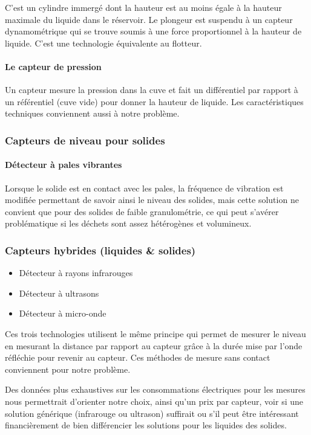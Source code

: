 C'est un cylindre immergé dont la hauteur est au moins égale à la hauteur maximale du liquide dans le réservoir. Le plongeur est suspendu à un capteur dynamométrique qui se trouve soumis à une force proportionnel à la hauteur de liquide. C’est une technologie équivalente au flotteur.

\paragraph{Le capteur de pression}

Un capteur mesure la pression dans la cuve et fait un différentiel par rapport à un référentiel (cuve vide) pour donner la hauteur de liquide. Les caractéristiques techniques conviennent aussi à notre problème.

\subsubsection{Capteurs de niveau pour solides}

\paragraph{Détecteur à pales vibrantes}

Lorsque le solide est en contact avec les pales, la fréquence de vibration est modifiée permettant de savoir ainsi le niveau des solides, mais cette solution ne convient que pour des solides de faible granulométrie, ce qui peut s’avérer problématique si les déchets sont assez hétérogènes et volumineux.

\subsubsection{Capteurs hybrides (liquides \&  solides)}

\begin{itemize}
\item Détecteur à rayons infrarouges
\item Détecteur à ultrasons
\item Détecteur à micro-onde
\end{itemize}

Ces trois technologies utilisent le même principe qui permet de mesurer le niveau en mesurant la distance par rapport au capteur grâce à la durée mise par l’onde réfléchie pour revenir au capteur. Ces méthodes de mesure sans contact conviennent pour notre problème.

Des données plus exhaustives sur les consommations électriques pour les mesures nous permettrait d’orienter notre choix, ainsi qu’un prix par capteur, voir si une solution générique (infrarouge ou ultrason) suffirait ou s’il peut être intéressant financièrement de bien différencier les solutions pour les liquides des solides.

